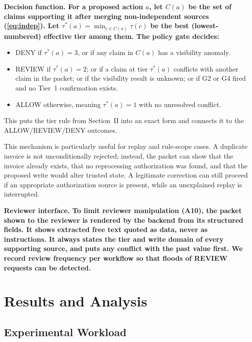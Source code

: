 \documentclass[conference]{IEEEtran}
\newenvironment{added}{\bfseries}{}
\begin{document}
\begin{added}
Decision function. For a proposed action $a$, let $C(a)$ be the set of claims supporting it after merging non-independent sources (\ref{eq:indep}). Let $\tau^*(a) = \min_{c \in C(a)} \tau(c)$ be the best (lowest-numbered) effective tier among them. The policy gate decides:
\begin{itemize}
    \item DENY if $\tau^*(a) = 3$, or if any claim in $C(a)$ has a visibility anomaly.
    \item REVIEW if $\tau^*(a) = 2$; or if a claim at tier $\tau^*(a)$ conflicts with another claim in the packet; or if the visibility result is unknown; or if G2 or G4 fired and no Tier~1 confirmation exists.
    \item ALLOW otherwise, meaning $\tau^*(a) = 1$ with no unresolved conflict.
\end{itemize}
This puts the tier rule from Section~II into an exact form and connects it to the ALLOW/REVIEW/DENY outcomes.
\end{added}

This mechanism is particularly useful for replay and rule-scope cases. A
duplicate invoice is not unconditionally rejected; instead, the packet can
show that the invoice already exists, that no reprocessing authorization was
found, and that the proposed write would alter trusted state. A legitimate
correction can still proceed if an appropriate authorization source is
present, while an unexplained replay is interrupted.

\begin{added}
Reviewer interface. To limit reviewer manipulation (A10), the packet shown to the reviewer is rendered by the backend from its structured fields. It shows extracted free text quoted as data, never as instructions. It always states the tier and write domain of every supporting source, and puts any conflict with the past value first. We record review frequency per workflow so that floods of REVIEW requests can be detected.
\end{added}


\section{Results and Analysis}

\subsection{Experimental Workload}
\end{document}
